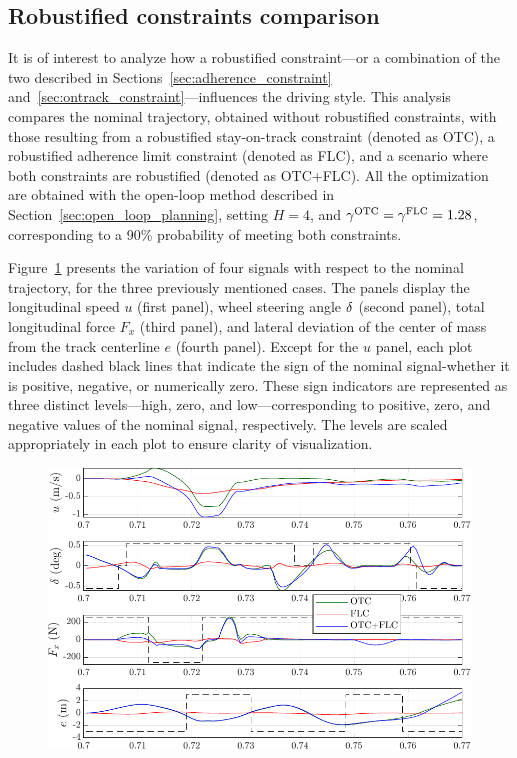 \subsection{Robustified constraints comparison}
It is of interest to analyze how a robustified constraint---or a combination of the two described in Sections~\ref{sec:adherence_constraint} and~\ref{sec:ontrack_constraint}---influences the driving style. This analysis compares the nominal trajectory, obtained without robustified constraints, with those resulting from a robustified stay-on-track constraint (denoted as OTC), a robustified adherence limit constraint (denoted as FLC), and a scenario where both constraints are robustified (denoted as OTC+FLC). All the optimization are obtained with the open-loop method described in Section~\ref{sec:open_loop_planning}, setting $H=4$, and $\gamma^\textrm{OTC}=\gamma^\textrm{FLC}=1.28$, corresponding to a 90\% probability of meeting both constraints. 

Figure~\ref{fig:ol_telemetries} presents the variation of four signals with respect to the nominal trajectory, for the three previously mentioned cases. The panels display the longitudinal speed $u$ (first panel), wheel steering angle $\delta$ (second panel), total longitudinal force $F_x$ (third panel), and lateral deviation of the center of mass from the track centerline $e$ (fourth panel). Except for the $u$ panel, each plot includes dashed black lines that indicate the sign of the nominal signal-whether it is positive, negative, or numerically zero. These sign indicators are represented as three distinct levels---high, zero, and low---corresponding to positive, zero, and negative values of the nominal signal, respectively. The levels are scaled appropriately in each plot to ensure clarity of visualization.

\begin{figure}
	\centering
	\includegraphics{Fig/ol_telemetries.pdf}
	\caption{}
	\label{fig:ol_telemetries}
\end{figure}

